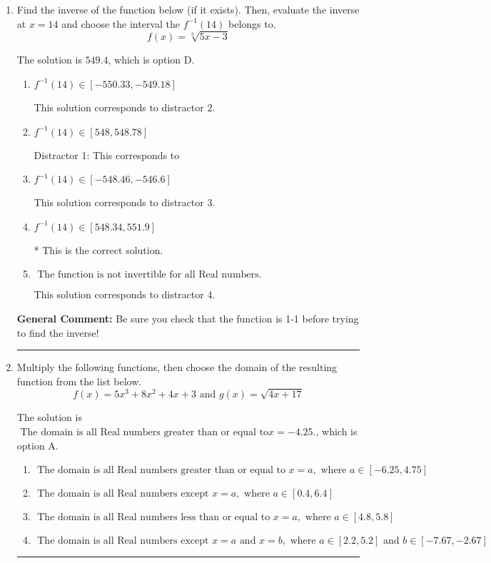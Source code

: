 \documentclass{extbook}[14pt]
\newcommand{\litem}[1]{\item #1

\rule{\textwidth}{0.4pt}}
\begin{document}
\begin{enumerate}\litem{
Find the inverse of the function below (if it exists). Then, evaluate the inverse at $x = 14$ and choose the interval the $f^{-1}(14)$ belongs to.
\[ f(x) = \sqrt[3]{5 x - 3} \]

The solution is \( 549.4 \), which is option D.\begin{enumerate}[label=\Alph*.]
\item \( f^{-1}(14) \in [-550.33, -549.18] \)

 This solution corresponds to distractor 2.
\item \( f^{-1}(14) \in [548, 548.78] \)

 Distractor 1: This corresponds to 
\item \( f^{-1}(14) \in [-548.46, -546.6] \)

 This solution corresponds to distractor 3.
\item \( f^{-1}(14) \in [548.34, 551.9] \)

* This is the correct solution.
\item \( \text{ The function is not invertible for all Real numbers. } \)

 This solution corresponds to distractor 4.
\end{enumerate}

\textbf{General Comment:} Be sure you check that the function is 1-1 before trying to find the inverse!
}
\litem{
Multiply the following functions, then choose the domain of the resulting function from the list below.
\[ f(x) = 5x^{3} +8 x^{2} +4 x + 3 \text{ and } g(x) = \sqrt{4x+17}  \]

The solution is \( \text{ The domain is all Real numbers greater than or equal to} x = -4.25. \), which is option A.\begin{enumerate}[label=\Alph*.]
\item \( \text{ The domain is all Real numbers greater than or equal to } x = a, \text{ where } a \in [-6.25, 4.75] \)


\item \( \text{ The domain is all Real numbers except } x = a, \text{ where } a \in [0.4, 6.4] \)


\item \( \text{ The domain is all Real numbers less than or equal to } x = a, \text{ where } a \in [4.8, 5.8] \)


\item \( \text{ The domain is all Real numbers except } x = a \text{ and } x = b, \text{ where } a \in [2.2, 5.2] \text{ and } b \in [-7.67, -2.67] \)



\end{enumerate}}
\end{enumerate}
\end{document}

